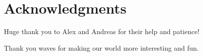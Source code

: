 \chapter*{Acknowledgments}
\thispagestyle{plain}

Huge thank you to Alex and Andreas for their help and patience!

Thank you waves for making our world more interesting and fun.


